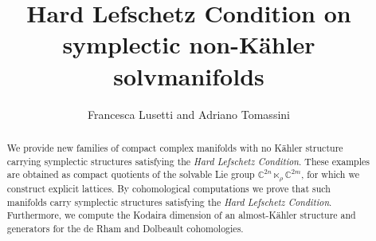 \documentclass[a4paper, 11pt]{amsart}
\title[Hard Lefschetz Condition on symplectic non-K\"ahler solvmanifolds]{Hard Lefschetz Condition on symplectic non-K\"ahler solvmanifolds}
\author{Francesca Lusetti and Adriano Tomassini}
\date{}
\theoremstyle{plain}
\theoremstyle{definition}
\newcommand{\C}{\mathbb{C}}
\numberwithin{equation}{section}
\begin{document}
\begin{abstract}
We provide new families of compact complex manifolds with no K\"ahler structure carrying symplectic structures satisfying the \textit{Hard Lefschetz Condition}. These examples are obtained as compact quotients of the solvable Lie group $\C^{2n} \ltimes_{\rho} \C^{2m}$, for which we construct explicit lattices. By cohomological computations we prove that such manifolds carry symplectic structures satisfying the \textit{Hard Lefschetz Condition}. Furthermore, we compute the Kodaira dimension of an almost-K\"ahler structure and generators for the de Rham and Dolbeault cohomologies.
\end{abstract}

\maketitle

\tableofcontents
\end{document}
